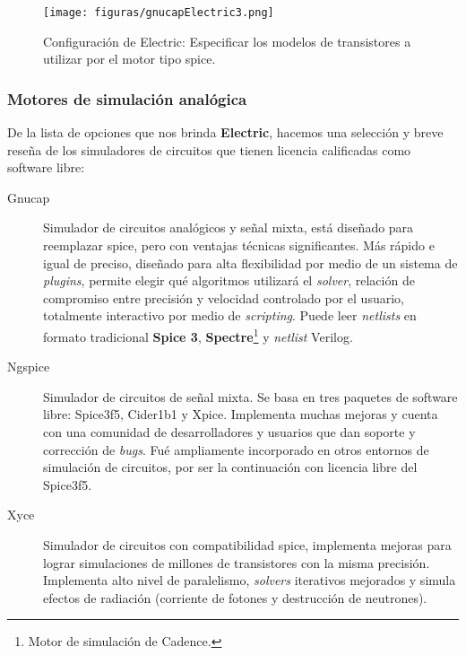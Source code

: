 \begin{figure}
  \centering
\texttt{[image: figuras/gnucapElectric3.png]}
  \caption{Configuración de Electric: Especificar los modelos de transistores a utilizar por el motor tipo \gls{spice}.}
\label{fig:gnucapElectric}
\end{figure}



\subsubsection{Motores de simulación analógica}

De la lista de opciones que nos brinda \textbf{Electric}, hacemos una selección y breve reseña de los simuladores de circuitos que tienen licencia calificadas como software libre:


\begin{description}
\item[Gnucap] Simulador de circuitos analógicos y señal mixta, está diseñado para reemplazar \gls{spice}, pero con ventajas técnicas significantes. Más rápido e igual de preciso, diseñado para alta flexibilidad por medio de un sistema de \emph{plugins}, permite elegir qué algoritmos utilizará el \emph{solver}, relación de compromiso entre precisión y velocidad controlado por el usuario, totalmente interactivo por medio de \emph{scripting}. Puede leer \emph{netlists} en formato tradicional \textbf{Spice 3}, \textbf{Spectre}\footnote{Motor de simulación de Cadence.} y  \emph{netlist} Verilog.

\item[Ngspice] Simulador de circuitos de señal mixta. Se basa en tres paquetes de software libre: Spice3f5, Cider1b1 y Xpice. Implementa muchas mejoras y cuenta con una comunidad de desarrolladores y usuarios que dan soporte y corrección de \emph{bugs}. Fué ampliamente incorporado en otros entornos de simulación de circuitos, por ser la continuación con licencia libre del Spice3f5.

\item[Xyce] Simulador de circuitos con compatibilidad \gls{spice}, implementa mejoras para lograr simulaciones de millones de transistores con la misma precisión. Implementa alto nivel de paralelismo, \emph{solvers} iterativos mejorados y simula efectos de radiación (corriente de fotones y destrucción de neutrones).
\end{description}

